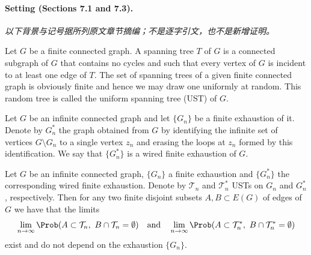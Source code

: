 \paragraph{Setting (Sections 7.1 and 7.3).}
\noindent\textit{以下背景与记号据所列原文章节摘编；不是逐字引文，也不是新增证明。}\par
Let $G$ be a finite connected graph. A spanning tree $T$ of $G$ is a connected subgraph of $G$ that contains no cycles and such that every vertex of $G$ is incident to at least one edge of $T$. The set of spanning trees of a given finite connected graph is obviously finite and hence we may draw one uniformly at random. This random tree is called the uniform spanning tree (UST) of $G$.

Let $G$ be an infinite connected graph and let $\{G_n\}$ be a finite exhaustion of it. Denote by $G_n^*$ the graph obtained from $G$ by identifying the infinite set of vertices $G\setminus G_n$ to a single vertex $z_n$ and erasing the loops at $z_n$ formed by this identification. We say that $\{G_n^*\}$ is a wired finite exhaustion of $G$.

\begin{theorem}[7.3, Pemantle]
Let $G$ be an infinite connected graph, $\{G_n\}$ a finite exhaustion and $\{G_n^*\}$ the corresponding wired finite exhaustion. Denote by $\mathcal T_n$ and $\mathcal T_n^*$ USTs on $G_n$ and $G_n^*$, respectively. Then for any two finite disjoint subsets $A,B\subset E(G)$ of edges of $G$ we have that the limits
\[
\lim_{n\to\infty}\Prob(A\subset\mathcal T_n,\ B\cap\mathcal T_n=\emptyset)
\quad\text{and}\quad
\lim_{n\to\infty}\Prob(A\subset\mathcal T_n^*,\ B\cap\mathcal T_n^*=\emptyset)
\]
exist and do not depend on the exhaustion $\{G_n\}$.
\end{theorem}

